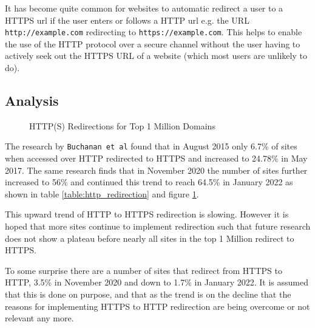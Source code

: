 \documentclass{mscreport}
\begin{document}
\vspace{0.3cm} \noindent
It has become quite common for websites to automatic redirect a user to a HTTPS url if the user enters or follows a HTTP url e.g. the URL \texttt{http://example.com} redirecting to \texttt{https://example.com}. This helps to enable the use of the HTTP protocol over a secure channel without the user having to actively seek out the HTTPS URL of a website (which most users are unlikely to do).

\subsection{Analysis}

\begin{figure}[H]
	\begin{center}
		\caption{HTTP(S) Redirections for Top 1 Million Domains}
		\label{fig:http_redirection}
	\end{center}
\end{figure}


\noindent
The research by \texttt{Buchanan et al} \cite{Buchanan2018-xz} found that in August 2015 only 6.7\% of sites when accessed over HTTP redirected to HTTPS and increased to 24.78\% in May 2017. The same research finds that in November 2020 the number of sites further increased to 56\% and continued this trend to reach 64.5\% in January 2022 as shown in table \ref{table:http_redirection} and figure \ref{fig:http_redirection}.

\newpage

\vspace{0.3cm} \noindent
This upward trend of HTTP to HTTPS redirection is slowing. However it is hoped that more sites continue to implement redirection such that future research does not show a plateau before nearly all sites in the top 1 Million redirect to HTTPS.

\vspace{0.3cm} \noindent
To some surprise there are a number of sites that redirect from HTTPS to HTTP, 3.5\% in November 2020 and  down to 1.7\% in January 2022. It is assumed that this is done on purpose, and that as the trend is on the decline that the reasons for implementing HTTPS to HTTP redirection are being overcome or not relevant any more.
\end{document}
